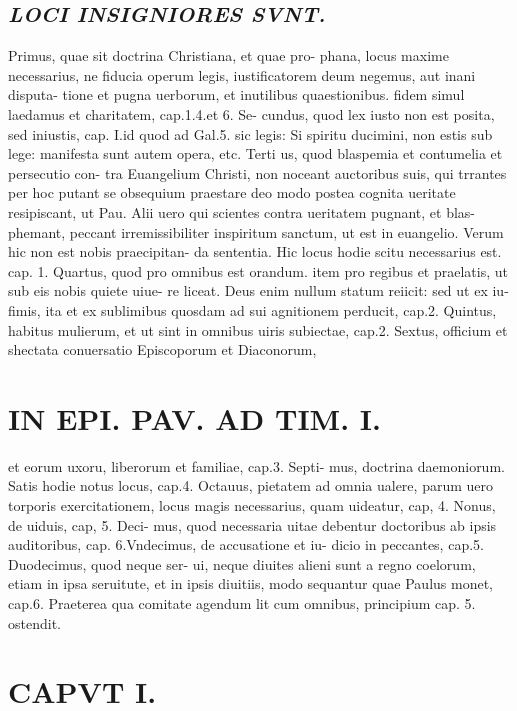 \documentclass{article}
\begin{document}
\begin{pages}
\subsection*{\textit{LOCI INSIGNIORES SVNT. }}\pstart Primus, quae sit doctrina Christiana, et quae pro- phana, locus maxime necessarius, ne fiducia operum legis, iustificatorem deum negemus, aut inani disputa- tione et pugna uerborum, et inutilibus quaestionibus. fidem simul laedamus et charitatem, cap.1.4.et 6. Se- cundus, quod lex iusto non est posita, sed iniustis, cap. I.id quod ad Gal.5. sic legis: Si spiritu ducimini, non estis sub lege: manifesta sunt autem opera, etc. Terti us, quod blaspemia et contumelia et persecutio con- tra Euangelium Christi, non noceant auctoribus suis, qui trrantes per hoc putant se obsequium praestare deo modo postea cognita ueritate resipiscant, ut Pau. Alii uero qui scientes contra ueritatem pugnant, et blas- phemant, peccant irremissibiliter inspiritum sanctum, ut est in euangelio. Verum hic non est nobis praecipitan- da sententia. Hic locus hodie scitu necessarius est. cap. 1. Quartus, quod pro omnibus est orandum. item pro regibus et praelatis, ut sub eis nobis quiete uiue- re liceat. Deus enim nullum statum reiicit: sed ut ex iu- fimis, ita et ex sublimibus quosdam ad sui agnitionem perducit, cap.2. Quintus, habitus mulierum, et ut sint in omnibus uiris subiectae, cap.2. Sextus, officium et shectata conuersatio Episcoporum et Diaconorum,  \pend
\section*{IN EPI. PAV. AD TIM. I. }
\marginpar{[ p.79 ]}\pstart et eorum uxoru, liberorum et familiae, cap.3. Septi- mus, doctrina daemoniorum. Satis hodie notus locus, cap.4. Octauus, pietatem ad omnia ualere, parum uero torporis exercitationem, locus magis necessarius, quam uideatur, cap, 4. Nonus, de uiduis, cap, 5. Deci- mus, quod necessaria uitae debentur doctoribus ab ipsis auditoribus, cap. 6.Vndecimus, de accusatione et iu- dicio in peccantes, cap.5. Duodecimus, quod neque  ser- ui, neque  diuites alieni sunt a regno coelorum, etiam in ipsa seruitute, et in ipsis diuitiis, modo sequantur quae Paulus monet, cap.6. Praeterea qua comitate agendum lit cum omnibus, principium cap. 5. ostendit.  \pend
\endnumbering\beginnumbering\section{CAPVT I.}
{}

\end{pages}
\end{document}
